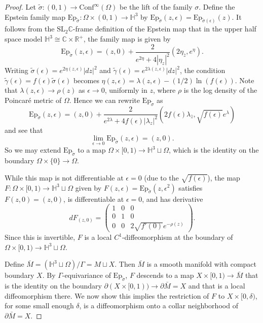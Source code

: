 \documentclass{amsart}
\newcommand{\R}{\mathbb{R}}
\newcommand{\C}{\mathbb{C}}
\renewcommand{\H}{\mathbb{H}}
\begin{document}
\begin{proof} 
Let $\tilde{\sigma}:(0,1) \to \mathrm{Conf}^\infty(\Omega)$ be the lift of the family $\sigma$. 
Define the Epstein family map $\mathrm{Ep}_{\tilde{\sigma}}: \Omega \times (0,1) \to \H^3$ by $\mathrm{Ep}_{\tilde{\sigma}}(z,\epsilon) = \mathrm{Ep}_{\tilde{\sigma}(\epsilon)}(z)$. 
It follows from the $\mathrm{SL}_2\C$-frame definition of the Epstein map that in the upper half space model $\H^3 \cong \C \times \R^+$, the family map is given by 
\[
\mathrm{Ep}_{\tilde{\sigma}}(z,\epsilon) = (z,0) + \frac{2}{e^{2\eta} + 4 |\eta_z|^2}\left(2 \eta_{\bar{z}}, e^\eta \right).
\]
Writing $\tilde{\sigma}(\epsilon) = e^{2 \eta(z,\epsilon)}|dz|^2$ and $\tilde{\gamma}(\epsilon) = e^{2 \lambda(z,\epsilon)}|dz|^2$, the condition $\tilde{\gamma}(\epsilon) = f(\epsilon)\tilde{\sigma}(\epsilon)$ becomes $\eta(z,\epsilon) = \lambda(z,\epsilon) - (1/2) \ln(f(\epsilon))$.
Note that $\lambda(z,\epsilon) \to \rho(z)$ as $\epsilon \to 0$, uniformly in $z$, where $\rho$ is the log density of the Poincar\'e metric of $\Omega$. 
Hence we can rewrite $\mathrm{Ep}_{\tilde{\sigma}}$ as 
\[
\mathrm{Ep}_{\tilde{\sigma}}(z,\epsilon) = (z,0)  + \frac{2}{e^{2\lambda} + 4 f(\epsilon) |\lambda_z|^2} \left( 2 f(\epsilon) \lambda_{\bar{z}},  \sqrt{f(\epsilon)}e^{\lambda} \right)
\]
and see that
\[
\lim_{\epsilon \to 0} \mathrm{Ep}_{\tilde{\sigma}} (z,\epsilon) = (z,0).
\]
So we may extend $\mathrm{Ep}_{\tilde{\sigma}}$ to a map $\Omega \times [0,1) \to \H^3 \sqcup \Omega$, which is the identity on the boundary $\Omega \times \{0\} \to \Omega$. 

While this map is not differentiable at $\epsilon = 0$ (due to the $\sqrt{f(\epsilon)}$), the map $F: \Omega \times [0,1) \to \H^3 \sqcup \Omega$ given by $F(z,\epsilon) = \mathrm{Ep}_{\tilde{\sigma}}(z,\epsilon^2)$ satisfies $F(z,0) = (z,0)$, is differentiable at $\epsilon = 0$, and has derivative  
\[
d F_{(z,0)} = 
\begin{pmatrix}
1 & 0 & 0 \\
0 & 1 & 0 \\
0 & 0 & 2 \sqrt{f'(0)} e^{-\rho(z)}
\end{pmatrix}.
\]
Since this is invertible, $F$ is a local $C^1$-diffeomorphism at the boundary of $\Omega \times [0,1) \to \H^3 \sqcup \Omega$.

Define $\bar{M} = ( \H^3 \sqcup \Omega ) /\Gamma = M \sqcup X$.
Then $\bar{M}$ is a smooth manifold with compact boundary $X$. 
By $\Gamma$-equivariance of $\mathrm{Ep}_{\tilde{\sigma}}$, $F$ descends to a map $X \times[0,1) \to \bar{M}$ that is the identity on the boundary $\partial(X \times [0,1)) \to \partial{\bar{M}} = X$ and that is a local diffeomorphism there. 
We now show this implies the restriction of $F$ to $X \times [0, \delta)$, for some small enough $\delta$, is a diffeomorphism onto a collar neighborhood of $\partial \bar{M} = X$. 


\end{proof}
\end{document}
